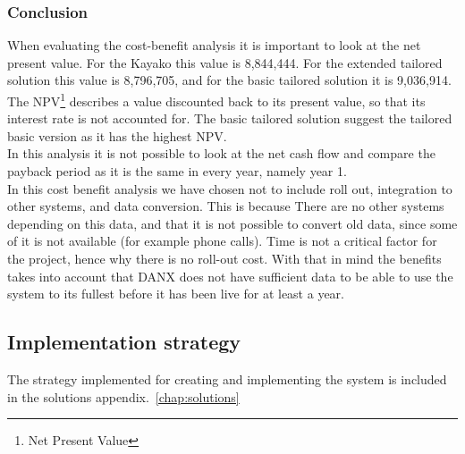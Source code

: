 \subsubsection{Conclusion}

When evaluating the cost-benefit analysis it is important to look at the net present value. For the Kayako this value is 8,844,444. For the extended tailored solution this value is 8,796,705, and for the basic tailored solution it is 9,036,914.\cite{img002}\cite{img003}\cite{img004}
The NPV\footnote{Net Present Value} describes a value discounted back to its present value, so that its interest rate is not accounted for. The basic tailored solution suggest the tailored basic version as it has the highest NPV.\\
In this analysis it is not possible to look at the net cash flow and compare the payback period as it is the same in every year, namely year 1.\\
In this cost benefit analysis we have chosen not to include roll out, integration to other systems, and data conversion. This is because There are no other systems depending on this data, and that it is not possible to convert old data, since some of it is not available (for example phone calls). Time is not a critical factor for the project, hence why there is no roll-out cost. With that in mind the benefits takes into account that DANX does not have sufficient data to be able to use the system to its fullest before it has been live for at least a year.

\subsection{Implementation strategy}
The strategy implemented for creating and implementing the system is included in the solutions appendix.~\ref{chap:solutions}